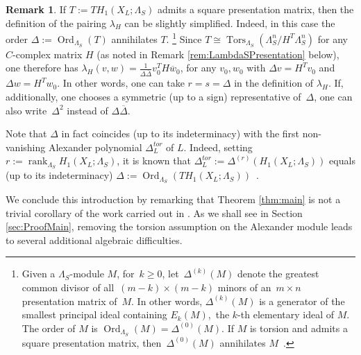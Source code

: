 \documentclass[11pt,a4paper]{amsart}
\theoremstyle{definition}
\newtheorem{remark}[theorem]{Remark}
\begin{document}
\begin{remark}
\label{rem:Scott}
If $T:=TH_1(X_L;\Lambda_S)$ admits a square presentation matrix, then the definition of the pairing $\lambda_H$ can be slightly simplified.
Indeed, in this case the order $\Delta:=\operatorname{Ord}_{\Lambda_S}(T)$ annihilates $T$.
\footnote{Given a $\Lambda_S$-module $M$, for~$k \ge 0$, let~$\Delta^{(k)}(M)$ denote the greatest common divisor of all~$(m-k) \times (m-k)$ minors of an~$m\times n$ presentation matrix of~$M$. 
In other words, $\Delta^{(k)}(M)$ is a generator of the smallest principal ideal containing $E_k(M),$
the $k$-th elementary ideal of $M$.
The order of $M$ is $\operatorname{Ord}_{\Lambda_S}(M)=\Delta^{(0)}(M)$.
If $M$ is torsion and admits a square presentation matrix, then~$\Delta^{(0)}(M)$ annihilates $M$~\cite[Remark 2 on page~31]{HillmanAlexanderIdeals}.
}
Since $T \cong \operatorname{Tors}_{\Lambda_S}(\Lambda_S^n/H^T\Lambda_S^n)$ for any $C$-complex matrix $H$ (as noted in Remark \ref{rem:LambdaSPresentation} below), one therefore has $\lambda_H(v,w)=\frac{1}{\Delta\overline{\Delta}}v_0^TH\overline{w}_0$, for any $v_0,w_0$ with $\Delta v=H^Tv_0$ and $\Delta w=H^Tw_0$.
In other words, one can take $r=s=\Delta$ in the definition of $\lambda_H$.
If, additionally, one chooses a symmetric (up to a sign) representative of~$\Delta$, one can also write~$\Delta^2$ instead of $\Delta\overline{\Delta}$.

Note that $\Delta$ in fact coincides (up to its indeterminacy) with the first non-vanishing Alexander polynomial $\Delta_L^{tor}$ of $L$.
Indeed, setting $r:=\operatorname{rank}_{\Lambda_S}H_1(X_L;\Lambda_S)$, it is known that $\Delta_L^{tor}:=\Delta^{(r)}(H_1(X_L;\Lambda_S))$ equals (up to its indeterminacy) $\Delta:=\operatorname{Ord}_{\Lambda_S}(TH_1(X_L;\Lambda_S))$~\cite[Lemma~4.9]{Turaev}. 
\end{remark}
\color{black}

We conclude this introduction by remarking that Theorem \ref{thm:main} is not a trivial corollary of the work carried out in \cite{ConwayFriedlToffoli}. As we shall see in Section \ref{sec:ProofMain}, removing the torsion assumption on the Alexander module leads to several additional algebraic difficulties. 
\end{document}
